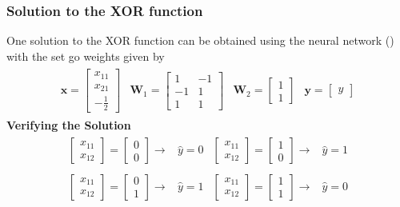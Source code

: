\subsubsection*{Solution to the XOR function}
One solution to the XOR function can be obtained using the neural network () with the set go weights given by
\begin{align}
  \begin{matrix}
    \textbf{x} = \begin{bmatrix}
      x_{11} \\
      x_{21} \\
      -\frac{1}{2}
    \end{bmatrix} & \textbf{W}_1 = \begin{bmatrix}
      1 & -1 \\
      -1 & 1 \\
      1 & 1
    \end{bmatrix} & \textbf{W}_2 = \begin{bmatrix}
      1 \\
      1
    \end{bmatrix} &
    \textbf{y} = \begin{bmatrix}
      y
    \end{bmatrix}  
  \end{matrix}
\end{align}
\textbf{Verifying the Solution}
\begin{align}
  \begin{matrix}
    \begin{bmatrix}
      x_{11} \\
      x_{12}
    \end{bmatrix} = \begin{bmatrix}
      0 \\
      0
    \end{bmatrix} \rightarrow & \widehat{y} = 0 & 
    \begin{bmatrix}
      x_{11} \\
      x_{12}
    \end{bmatrix} = \begin{bmatrix}
      1 \\
      0
    \end{bmatrix} \rightarrow & \widehat{y} = 1 \\
    \\
    \begin{bmatrix}
      x_{11} \\
      x_{12}
    \end{bmatrix} = \begin{bmatrix}
      0 \\
      1
    \end{bmatrix} \rightarrow & \widehat{y} = 1 & 
    \begin{bmatrix}
      x_{11} \\
      x_{12}
    \end{bmatrix} = \begin{bmatrix}
      1 \\
      1
    \end{bmatrix} \rightarrow & \widehat{y} = 0
  \end{matrix}
\end{align}
